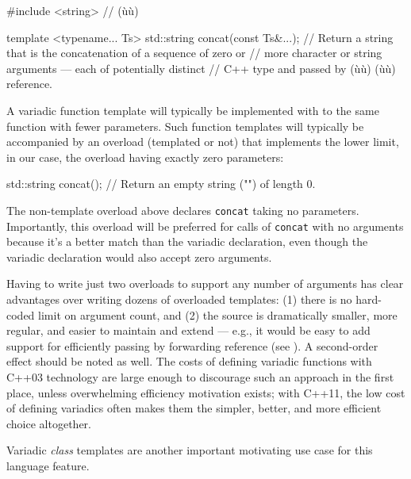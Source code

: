 \begin{emcppshiddenlisting}[emcppsbatch=e3]
#include <string>  // (ù{}ù)
\end{emcppshiddenlisting}
\begin{emcppslisting}[emcppsbatch=e3]
template <typename... Ts>
std::string concat(const Ts&...);
     // Return a string that is the concatenation of a sequence of zero or
     // more character or string arguments --- each of potentially distinct
     // C++ type and passed by (ù{}ù) (ù{}ù) reference.
\end{emcppslisting}
    

\noindent A variadic function template will typically be implemented with
 to the same function with fewer parameters. Such
function templates will typically be accompanied by an overload
(templated or not) that implements the lower limit, in our case, the
overload having exactly zero parameters:

\begin{emcppslisting}[emcppsbatch=e3]
std::string concat();
    // Return an empty string ("") of length 0.
\end{emcppslisting}
    

\noindent The non-template overload above declares \lstinline!concat! taking no
parameters. Importantly, this overload will be preferred for calls of
\lstinline!concat! with no arguments because it's a better match than the
variadic declaration, even though the variadic declaration would also
accept zero arguments.

Having to write just two overloads to support any number of arguments
has clear advantages over writing dozens of overloaded templates: (1)
there is no hard-coded limit on argument count, and (2) the source is
dramatically smaller, more regular, and easier to maintain and extend
--- e.g., it would be easy to add support for efficiently passing by
forwarding reference (see ). A
second-order effect should be noted as well. The costs of defining
variadic functions with C++03 technology are large enough to discourage
such an approach in the first place, unless overwhelming efficiency
motivation exists; with C++11, the low cost of defining variadics often
makes them the simpler, better, and more efficient choice altogether.

Variadic \emph{class} templates are another important motivating use
case for this language feature.

